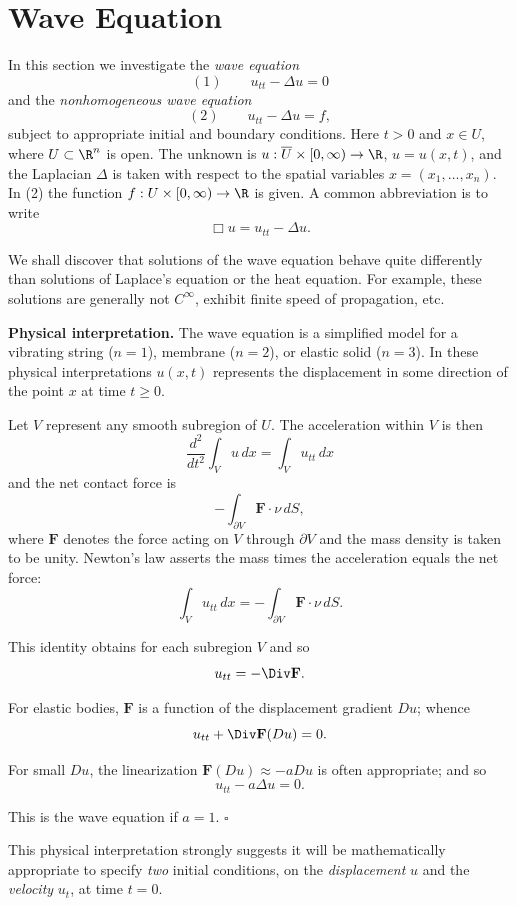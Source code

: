 \section{Wave Equation}
\label{sec:wave-equation}

In this section we investigate the \textit{wave equation}
$$(1) \qquad u_{tt} - \Delta u = 0$$
and the \textit{nonhomogeneous wave equation}
$$(2) \qquad u_{tt} - \Delta u = f,$$
subject to appropriate initial and boundary conditions. Here $t > 0$ and $x \in U$, where $U \subset \R^n$ is open. The unknown is $u : \overline{U} \times [0, \infty) \to \R$, $u = u(x,t)$, and the Laplacian $\Delta$ is taken with respect to the spatial variables $x = (x_1, \ldots, x_n)$. In (2) the function $f : U \times [0, \infty) \to \R$ is given. A common abbreviation is to write
$$\Box u = u_{tt} - \Delta u.$$

We shall discover that solutions of the wave equation behave quite differently than solutions of Laplace's equation or the heat equation. For example, these solutions are generally not $C^\infty$, exhibit finite speed of propagation, etc.

\textbf{Physical interpretation.} The wave equation is a simplified model for a vibrating string ($n = 1$), membrane ($n = 2$), or elastic solid ($n = 3$). In these physical interpretations $u(x, t)$ represents the displacement in some direction of the point $x$ at time $t \geq 0$.

Let $V$ represent any smooth subregion of $U$. The acceleration within $V$ is then
$$\frac{d^2}{dt^2} \int_V u \, dx = \int_V u_{tt} \, dx$$
and the net contact force is
$$-\int_{\partial V} \mathbf{F} \cdot \nu \, dS,$$
where $\mathbf{F}$ denotes the force acting on $V$ through $\partial V$ and the mass density is taken to be unity. Newton's law asserts the mass times the acceleration equals the net force:
$$\int_V u_{tt} \, dx = -\int_{\partial V} \mathbf{F} \cdot \nu \, dS.$$

This identity obtains for each subregion $V$ and so
$$u_{tt} = -\Div \mathbf{F}.$$

For elastic bodies, $\mathbf{F}$ is a function of the displacement gradient $Du$; whence
$$u_{tt} + \Div \mathbf{F}(Du) = 0.$$

For small $Du$, the linearization $\mathbf{F}(Du) \approx -a Du$ is often appropriate; and so
$$u_{tt} - a \Delta u = 0.$$

This is the wave equation if $a = 1$. $\square$

This physical interpretation strongly suggests it will be mathematically appropriate to specify \textit{two} initial conditions, on the \textit{displacement} $u$ and the \textit{velocity} $u_t$, at time $t = 0$.

